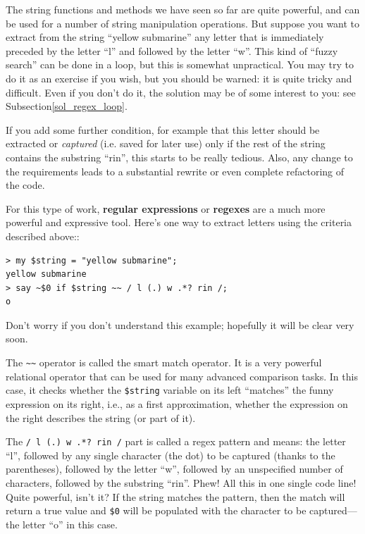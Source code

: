 The string functions and methods we have seen so far are 
quite powerful, and can be used for a number of string 
manipulation operations. But suppose you want to extract 
from the string ``yellow submarine'' any letter that is 
immediately preceded by the letter ``l'' and followed by 
the letter ``w''. This kind of ``fuzzy search'' 
can be done in a loop, but this is 
somewhat unpractical. You may try to do it as an exercise if 
you wish, but you should be warned: it is quite tricky and 
difficult. Even if you don't do it, the solution may be of some 
interest to you: see Subsection\ref{sol_regex_loop}. 
\label{regex_loop}


If you add some further condition, 
for example that this letter should be extracted or 
\emph{captured} (i.e. saved for later use) only if 
the rest of the string contains the substring ``rin'', 
this starts to be really tedious. Also, any change to the 
requirements leads to a substantial rewrite or even 
complete refactoring of the code.

For this type of work, {\bf regular expressions} or 
{\bf regexes}  are a much more powerful and expressive tool. 
Here's one way to extract letters using the criteria 
described above::

\begin{verbatim}
> my $string = "yellow submarine";
yellow submarine
> say ~$0 if $string ~~ / l (.) w .*? rin /;
o
\end{verbatim}

Don't worry if you don't understand this example; 
hopefully it will be clear very soon.

The \verb'~~' operator is called the smart match operator. It is 
a very powerful relational operator that can be used for 
many advanced comparison tasks. In this case, it checks whether 
the {\tt \$string} variable on its left ``matches''  
the funny expression on its right, i.e., as a first 
approximation, whether the expression on the right describes 
the string (or part of it). 

The \verb'/ l (.) w .*? rin /' part is called a regex pattern and means: 
the letter ``l'', followed by any single character (the dot) to be 
captured (thanks to the parentheses), followed by the letter ``w'', 
followed by an unspecified number of characters, followed by the 
substring ``rin''. Phew! All this in one single code line! Quite 
powerful, isn't it? If the string matches the pattern, then 
the match will return a true value and \verb'$0' will be 
populated with the character to be captured---the letter ``o'' 
in this case.

